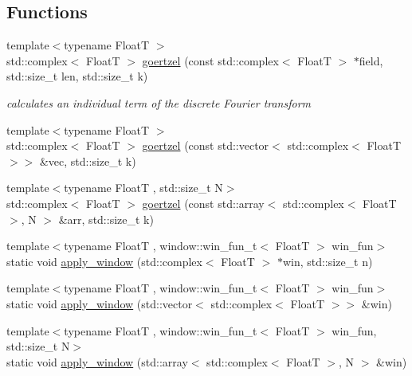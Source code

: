 \subsection*{Functions}
\begin{DoxyCompactItemize}
\item 
{\footnotesize template$<$typename FloatT $>$ }\\std\+::complex$<$ FloatT $>$ \hyperlink{namespacedevfix_1_1dsp_a5e776756816f3429899134f5c8b8b215}{goertzel} (const std\+::complex$<$ FloatT $>$ $\ast$field, std\+::size\+\_\+t len, std\+::size\+\_\+t k)
\begin{DoxyCompactList}\small\item\em calculates an individual term of the discrete Fourier transform \end{DoxyCompactList}\item 
{\footnotesize template$<$typename FloatT $>$ }\\std\+::complex$<$ FloatT $>$ \hyperlink{namespacedevfix_1_1dsp_a9c0640ca74af740499f9c3da2019930c}{goertzel} (const std\+::vector$<$ std\+::complex$<$ FloatT $>$$>$ \&vec, std\+::size\+\_\+t k)
\item 
{\footnotesize template$<$typename FloatT , std\+::size\+\_\+t N$>$ }\\std\+::complex$<$ FloatT $>$ \hyperlink{namespacedevfix_1_1dsp_a3eed4648161700e03c0f6d900bea9f73}{goertzel} (const std\+::array$<$ std\+::complex$<$ FloatT $>$, N $>$ \&arr, std\+::size\+\_\+t k)
\item 
{\footnotesize template$<$typename FloatT , window\+::win\+\_\+fun\+\_\+t$<$ Float\+T $>$ win\+\_\+fun$>$ }\\static void \hyperlink{namespacedevfix_1_1dsp_a45835752ed90577a53430b19eb80348c}{apply\+\_\+window} (std\+::complex$<$ FloatT $>$ $\ast$win, std\+::size\+\_\+t n)
\item 
{\footnotesize template$<$typename FloatT , window\+::win\+\_\+fun\+\_\+t$<$ Float\+T $>$ win\+\_\+fun$>$ }\\static void \hyperlink{namespacedevfix_1_1dsp_a299d793e30216ab3dc270c45fc1a1611}{apply\+\_\+window} (std\+::vector$<$ std\+::complex$<$ FloatT $>$$>$ \&win)
\item 
{\footnotesize template$<$typename FloatT , window\+::win\+\_\+fun\+\_\+t$<$ Float\+T $>$ win\+\_\+fun, std\+::size\+\_\+t N$>$ }\\static void \hyperlink{namespacedevfix_1_1dsp_a2843d1ef6aea33bdd37a84657b228414}{apply\+\_\+window} (std\+::array$<$ std\+::complex$<$ FloatT $>$, N $>$ \&win)

\end{DoxyCompactItemize}

